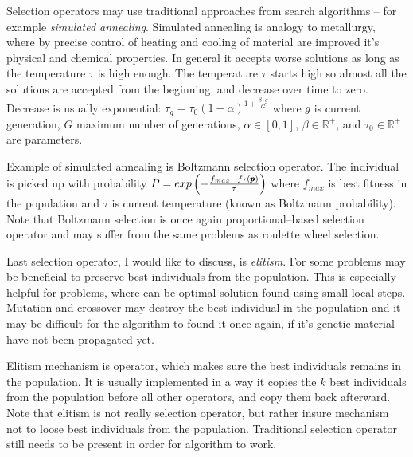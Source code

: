 Selection operators may use traditional approaches from search algorithms -- for example \emph{simulated annealing}. Simulated annealing is analogy to metallurgy, where by precise control of heating and cooling of material are improved it's physical and chemical properties. In general it accepts worse solutions as long as the temperature $\tau$ is high enough. The temperature $\tau$ starts high so almost all the solutions are accepted from the beginning, and decrease over time to zero. Decrease is usually exponential: $\tau_g=\tau_0(1-\alpha)^{1+\frac{\beta\cdot g}{G}}$ where $g$ is current generation, $G$ maximum number of generations, $\alpha\in\left[0,1\right]$, $\beta\in\mathbb{R}^+$, and $\tau_0\in\mathbb{R}^+$ are parameters. 

Example of simulated annealing is Boltzmann selection operator. The individual is picked up with probability 
$P=exp\left(-\frac{f_{max} - f_f(\pmb{p})}{\tau}\right)$
where $f_{max}$ is best fitness in the population and $\tau$ is current temperature (known as Boltzmann probability). Note that Boltzmann selection is once again proportional--based selection operator and may suffer from the same problems as roulette wheel selection.

Last selection operator, I would like to discuss, is \emph{elitism}. For some problems may be beneficial to preserve best individuals from the population. This is especially helpful for problems, where can be optimal solution found using small local steps. Mutation and crossover may destroy the best individual in the population and it may be difficult for the algorithm to found it once again, if it's genetic material have not been propagated yet. 

Elitism mechanism is operator, which makes sure the best individuals remains in the population. It is usually implemented in a way it copies the $k$ best individuals from the population before all other operators, and copy them back afterward. Note that elitism is not really selection operator, but rather insure mechanism not to loose best individuals from the population. Traditional selection operator still needs to be present in order for algorithm to work. 



